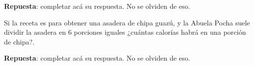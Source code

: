 \documentclass[10pt]{examdesign}
\begin{document}
\begin{shortanswer}[title={\textit{Receta que le dijo la Abuela Pocha a Ana y
    			Juan.}},
    	rearrange=no,resetcounter=no]
\begin{question}
\begin{answer}
        		\textbf{Repuesta}: completar acá su respuesta. No se olviden de eso.
        	\end{answer}
        \end{question}
        \begin{question}
        	Si la receta es para obtener una asadera de chipa guazú, y la Abuela Pocha suele dividir
        	la asadera en 6 porciones iguales ¿cuántas calorías habrá en una porción de chipa?.
        	\begin{answer}
        		\textbf{Repuesta}: completar acá su respuesta. No se olviden de eso.
        	\end{answer}
        \end{question}
    \end{shortanswer}
\end{document}
